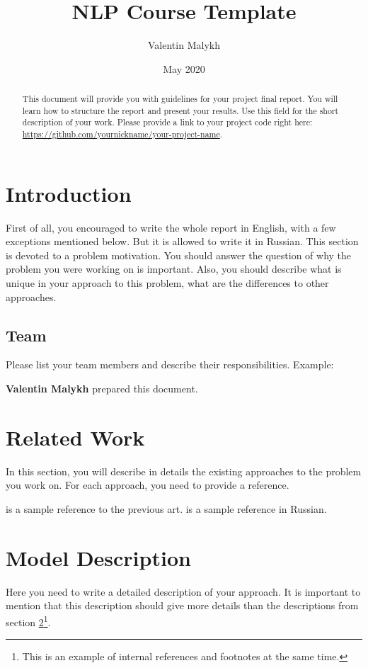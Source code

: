 \documentclass{article}
\title{NLP Course Template}
\author{Valentin Malykh}
\date{May 2020}
\begin{document}
\maketitle
\begin{abstract}
    This document will provide you with guidelines for your project final report. You will learn how to structure the report and present your results. Use this field for the short description of your work. Please provide a link to your project code right here: \url{https://github.com/yournickname/your-project-name}.
\end{abstract}



\section{Introduction}
First of all, you encouraged to write the whole report in English, with a few exceptions mentioned below. But it is allowed to write it in Russian.
This section is devoted to a problem motivation. You should answer the question of why the problem you were working on is important. Also, you should describe what is unique in your approach to this problem, what are the differences to other approaches.
\subsection{Team}
Please list your team members and describe their responsibilities. Example:

\textbf{Valentin Malykh} prepared this document.



\section{Related Work}
\label{sec:related}
In this section, you will describe in details the existing approaches to the problem you work on. For each approach, you need to provide a reference. 

\cite{levenshtein1966binary} is a sample reference to the previous art. \cite{levenshtein1966dvoichnie} is a sample reference in Russian.

\section{Model Description}
Here you need to write a detailed description of your approach. It is important to mention that this description should give more details than the descriptions from section \ref{sec:related}\footnote{This is an example of internal references and footnotes at the same time.}. 
\end{document}
